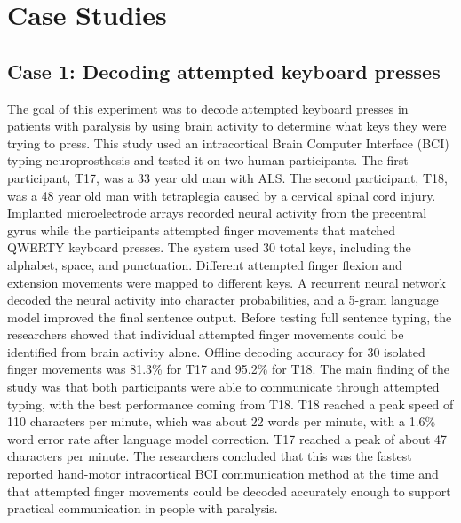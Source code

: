 \documentclass[11pt]{article}
\begin{document}
\section{Case Studies}

\subsection*{Case 1: Decoding attempted keyboard presses \cite{case_keyboard2026}}
The goal of this experiment was to decode attempted keyboard presses in patients
with paralysis by using brain activity to determine what keys they were trying
to press. This study used an intracortical Brain Computer Interface (BCI) typing
neuroprosthesis and tested it on two human participants. The first participant,
T17, was a 33 year old man with ALS. The second participant, T18, was a 48 year
old man with tetraplegia caused by a cervical spinal cord injury. Implanted
microelectrode arrays recorded neural activity from the precentral gyrus while
the participants attempted finger movements that matched QWERTY keyboard
presses. The system used 30 total keys, including the alphabet, space, and
punctuation. Different attempted finger flexion and extension movements were
mapped to different keys. A recurrent neural network decoded the neural activity
into character probabilities, and a 5-gram language model improved the final
sentence output. Before testing full sentence typing, the researchers showed
that individual attempted finger movements could be identified from brain
activity alone. Offline decoding accuracy for 30 isolated finger movements was
81.3\% for T17 and 95.2\% for T18. The main finding of the study was that both
participants were able to communicate through attempted typing, with the best
performance coming from T18. T18 reached a peak speed of 110 characters per
minute, which was about 22 words per minute, with a 1.6\% word error rate after
language model correction. T17 reached a peak of about 47 characters per minute.
The researchers concluded that this was the fastest reported hand-motor
intracortical BCI communication method at the time and that attempted finger
movements could be decoded accurately enough to support practical communication
in people with paralysis.
\end{document}
